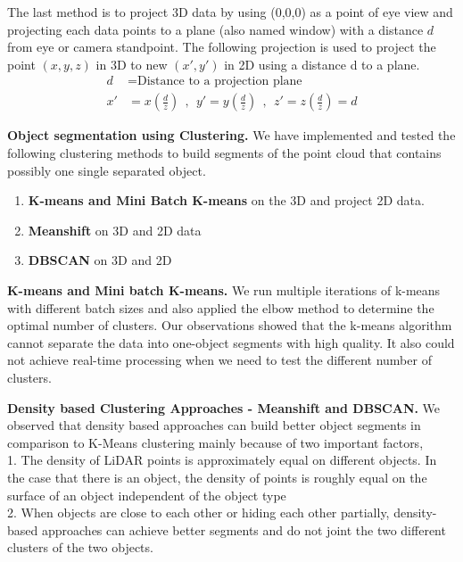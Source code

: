 The last method is to project 3D data by using 
(0,0,0) as
a point of eye view and projecting each data points
to a plane (also named window) with a distance $d$ from eye or camera standpoint.
The following projection is used to project the point $(x,y,z)$ in 3D to new $(x',  y')$ in 2D
using a distance d to a plane.
\begin{align*}
d  & = \text{Distance to a projection plane} \\
x' & =  x (\frac{d}{z}) \ \  , \ \  y' =  y (\frac{d}{z}) \ \  , \ \  z'=  z (\frac{d}{z}) = d
\end{align*}

\textbf{Object segmentation using Clustering.}
We have implemented and tested the following clustering methods to 
build segments of the point cloud
that contains 
possibly one single separated object.

\begin{enumerate}
  \item \textbf{K-means and Mini Batch K-means} on the 3D and project 2D data.
  \item \textbf{Meanshift} on 3D and 2D data
  \item \textbf{DBSCAN} on 3D and 2D
\end{enumerate}

\textbf{K-means and Mini batch K-means.}
We run multiple iterations of k-means with
different batch sizes and also applied the elbow method to determine the optimal number of clusters.
Our observations %
showed that the k-means algorithm cannot separate the data into one-object segments with high quality.
It also could not achieve real-time processing when we need to test the different number of clusters.

\textbf{Density based Clustering Approaches - Meanshift and DBSCAN.}
We observed that density based approaches can build better object segments in comparison to K-Means clustering mainly because of two important factors,\\
1. The density of LiDAR points is approximately equal on different objects.
In the case that there is an object, the density of points is roughly equal on the surface of
an object independent of the object type\\
2. When objects are close to each other or hiding each
other partially, density-based approaches can achieve better segments and do not joint the two different clusters of the two objects.

